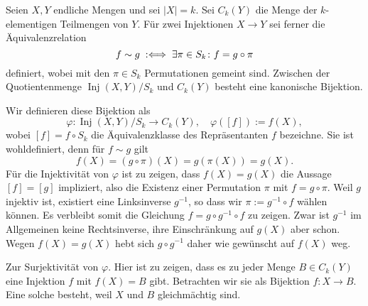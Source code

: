 \newpage
\begin{Satz}\label{bijection-from-k-subsets-to-orbits}
Seien $X,Y$ endliche Mengen und sei $|X|=k$. Sei $C_k(Y)$
die Menge der $k$-elementigen Teilmengen von $Y$. Für zwei
Injektionen $X\to Y$ sei ferner die Äquivalenzrelation
\[f\sim g \;:\Longleftrightarrow\; \exists\pi\in S_k\colon f=g\circ \pi\]
definiert, wobei mit den $\pi\in S_k$ Permutationen gemeint sind.
Zwischen der Quotientenmenge $\operatorname{Inj}(X, Y)/S_k$
und $C_k(Y)$ besteht eine kanonische Bijektion.
\end{Satz}
\begin{Beweis}
Wir definieren diese Bijektion als
\[\varphi\colon \operatorname{Inj}(X, Y)/S_k\to C_k(Y),
\quad \varphi([f]) := f(X),\]
wobei $[f]=f\circ S_k$ die Äquivalenzklasse des Repräsentanten $f$
bezeichne. Sie ist wohldefiniert, denn für $f\sim g$ gilt
\[f(X) = (g\circ\pi)(X) = g(\pi(X)) = g(X).\]
Für die Injektivität von $\varphi$ ist zu zeigen, dass $f(X) = g(X)$
die Aussage $[f]=[g]$ impliziert, also die Existenz einer Permutation
$\pi$ mit $f=g\circ\pi$. Weil $g$ injektiv ist, existiert eine
Linksinverse $g^{-1}$, so dass wir $\pi:=g^{-1}\circ f$ wählen
können. Es verbleibt somit die Gleichung $f=g\circ g^{-1}\circ f$ zu
zeigen. Zwar ist $g^{-1}$ im Allgemeinen keine Rechtsinverse, ihre
Einschränkung auf $g(X)$ aber schon. Wegen $f(X)=g(X)$ hebt sich
$g\circ g^{-1}$ daher wie gewünscht auf $f(X)$ weg.

Zur Surjektivität von $\varphi$. Hier ist zu zeigen, dass es zu jeder
Menge $B\in C_k(Y)$ eine Injektion $f$ mit $f(X)=B$ gibt. Betrachten
wir sie als Bijektion $f\colon X\to B$. Eine solche besteht,
weil $X$ und $B$ gleichmächtig sind.\,\qedsymbol
\end{Beweis}

